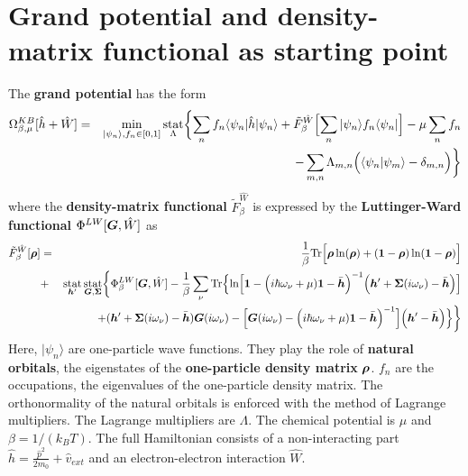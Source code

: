 \documentclass[11pt,a4paper]{report}
\begin{document}
\section{Grand potential and density-matrix 
functional as starting point}
The \textbf{grand potential}
 has the form\cite{bloechl13_prb88_25139}
\begin{eqnarray}
\Omega^{KB}_{\beta,\mu}[\hat{h}+\hat{W}]
&=&\min_{|\psi_n\rangle,f_n\in[0,1]}\operatorname*{stat}_\Lambda
\biggl\lbrace\sum_n f_n\langle\psi_n|\hat{h}|\psi_n\rangle
+\tilde{F}_\beta^{\hat{W}}\Bigl[\sum_n|\psi_n\rangle f_n\langle\psi_n|\Bigr]
-\mu\sum_n f_n\nonumber\\
&&
-\sum_{m,n}\Lambda_{m,n}\Bigl(\langle\psi_n|\psi_m\rangle-\delta_{m,n}\Bigr)
\biggr\rbrace
\label{eq:gcpdm2}
\end{eqnarray}
where the \textbf{density-matrix functional} $\tilde{F}_\beta^{\hat{W}}$ is
expressed\cite{bloechl13_prb88_25139} by the \textbf{Luttinger-Ward
  functional}
\cite{luttinger60_pr118_1417} $\Phi^{LW}[\bm{G},\hat{W}]$ as
\begin{eqnarray}
\tilde{F}^{\hat{W}}_\beta[\bm{\rho}]
&=&
\frac{1}{\beta}\mathrm{Tr}\Bigl[
\bm{\rho}\ln(\bm{\rho})+(\bm{1}-\bm{\rho})\ln(\bm{1}-\bm{\rho})\Bigr]
\nonumber\\
&+&
\operatorname*{stat}_{\bm{h}'}\operatorname*{stat}_{\bm{G},\bm{\Sigma}}
\biggl\lbrace
\Phi^{LW}_\beta[\bm{G},\hat{W}]
-\frac{1}{\beta}\sum_\nu\mathrm{Tr}\Bigl\lbrace
\ln\Bigl[
\bm{1}-
\Bigl(i\hbar\omega_\nu+\mu)\bm{1}-\bar{\bm{h}}\Bigr)^{-1}
\Bigl(\bm{h}'+\bm{\Sigma}(i\omega_\nu)-\bar{\bm{h}}\Bigr)
\Bigr]
\nonumber\\&&
+(\bm{h}'+\bm{\Sigma}(i\omega_\nu)-\bar{\bm{h}})\bm{G}(i\omega_\nu)
-
\Bigl[
\bm{G}(i\omega_\nu)
-\Bigl(i\hbar\omega_\nu+\mu)\bm{1}-\bar{\bm{h}}\Bigr)^{-1}
\Bigr]
\Bigl(\bm{h}'-\bar{\bm{h}}\Bigr)\Bigr\rbrace
\biggr\rbrace
\label{eq:dmfgreen}
\end{eqnarray}
Here, $|\psi_n\rangle$ are one-particle wave functions. They play the
role of \textbf{natural orbitals}, the
eigenstates of the \textbf{one-particle density
  matrix}
$\bm{\rho}$. $f_n$ are the occupations, the eigenvalues of the
one-particle density matrix. The orthonormality of the natural
orbitals is enforced with the method of Lagrange multipliers. The
Lagrange multipliers are $\Lambda$. The chemical potential is $\mu$
and $\beta=1/(k_BT)$. The full Hamiltonian consists of a
non-interacting part $\hat{h}=\frac{\hat{p}^2}{2m_0}+\hat{v}_{ext}$
and an electron-electron interaction $\hat{W}$. 
\end{document}
